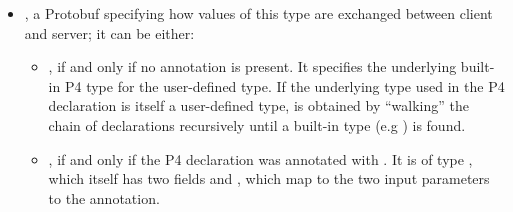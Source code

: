 \documentclass[11pt]{article}
\begin{document}
{%
\begin{itemize}%

\item{}
, a Protobuf  specifying how values of this type are
exchanged between client and server; it can be either:%

\begin{itemize}%

\item{}
, if and only if no  annotation is
present. It specifies the underlying built-in P4 type for the user-defined
type. If the underlying type used in the P4  declaration is itself a
user-defined type,  is obtained by \textquotedblleft{}walking\textquotedblright{} the chain of
 declarations recursively until a built-in type (e.g ) is
found.%

\item{}
, if and only if the P4  declaration was annotated
with . It is of type , which
itself has two fields \textemdash{}  and  \textemdash{}, which map to the
two input parameters to the annotation.%
\end{itemize}%


\end{itemize}}
\end{document}
